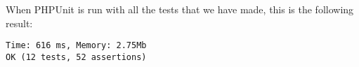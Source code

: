 When PHPUnit is run with all the tests that we have made, this is the following result:

\begin{lstlisting}[numbers=none, basicstyle=\ttfamily, caption={The result of our PHPUnit test}]
Time: 616 ms, Memory: 2.75Mb
OK (12 tests, 52 assertions)
\end{lstlisting}

